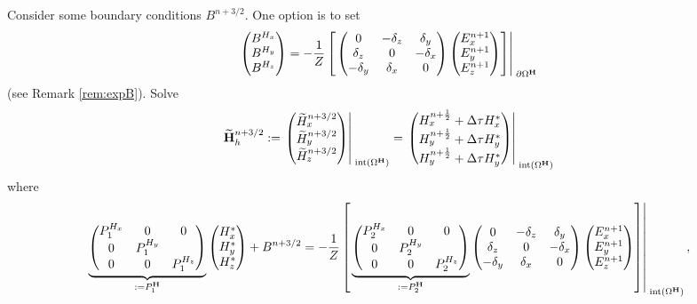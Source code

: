 \documentclass[12pt,reqno]{amsart}
\newcommand{\h}{{\bf H}}
\theoremstyle{definition}
\numberwithin{equation}{section}
\newcommand{\intr}[1]{\mathrm{int}(#1)}
\def\Gw{\Omega}     \def\Gx{\Xi}         \def\Gy{\Psi}
\begin{document}
	Consider some  boundary conditions $B^{n+3/2}$.
	One option is to set 
	\begin{equation}\label{eq:BH}
	\begin{pmatrix}
		B^{H_x}\\ B^{H_y}\\ B^{H_z}
	\end{pmatrix}
	=
	-\frac{1}{Z}
	\left[ \left.	
	\begin{pmatrix}
		0& -\delta_z & \delta _y\\
		\delta_z&0&-\delta_x\\
		-\delta_y&\delta_x&0\\
	\end{pmatrix}
	\begin{pmatrix}
		E_x^{n+1}\\
		E_y^{n+1}\\
		E_z^{n+1}
	\end{pmatrix}\right]\right|_{\; \partial{\Gw^{\h}}}^{\;}
	\end{equation}
	(see Remark \ref{rem:expB}).
Solve
	$$
	\widetilde{\h}_h^{n+3/2}:=
	\left.
	\begin{pmatrix}
		\widetilde{H}_x^{n+3/2}\\
		\widetilde{H}_y^{n+3/2}\\
		\widetilde{H}_z^{n+3/2}
	\end{pmatrix}\right|_{\; \intr{\Gw^{\h}}}^{\;}=
\left.
	\begin{pmatrix}
		H_x^{n+\frac{1}{2}}+\Delta \tau H_x^{*}\\
		H_y^{n+\frac{1}{2}}+\Delta \tau H_y^{*}\\
		H_y^{n+\frac{1}{2}}+\Delta \tau H_y^{*}
	\end{pmatrix}\right|_{\; \intr{\Gw^{\h}}}^{\;}
	$$
	where 
	$$
	\underbrace{
	\begin{pmatrix}
		P_1^{H_x}  & 0&0 \\
		0 & 	P_1^{H_y}  &\\
		0&0&	P_1^{H_z} 
	\end{pmatrix}
}_{:=P_1^\h}
	\begin{pmatrix}
		H_x^{*}\\
		H_y^{*} \\
		H_z^{*}
	\end{pmatrix}+B^{n+3/2}=-\frac{1}{Z}
\left[ \left.
	\underbrace{
	\begin{pmatrix}
		P_2^{H_x} & 0&0 \\
		0 & P_2^{H_y} &\\
		0&0&P_2^{H_z} 
	\end{pmatrix}
}_{:=P_2^\h}
	\begin{pmatrix}
		0& -\delta_z & \delta _y\\
		\delta_z&0&-\delta_x\\
		-\delta_y&\delta_x&0\\
	\end{pmatrix}
	\begin{pmatrix}
		E_x^{n+1}\\
		E_y^{n+1}\\
		E_z^{n+1}
	\end{pmatrix}\right]\right|_{\; \intr{\Gw^{\h}}}^{\;},
	$$
\end{document}
